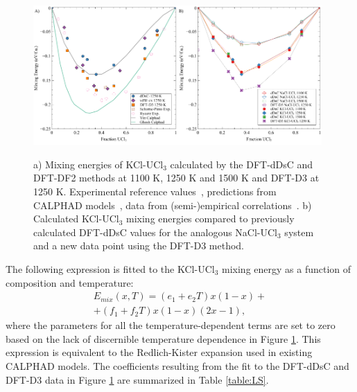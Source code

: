 \documentclass[preprint,3p,10pt,twocolumn,number,sort&compress]{elsarticle}
\begin{document}
\begin{figure}[h!]
\centering
\includegraphics[width=0.49\textwidth]{ben_fig2a.pdf}\includegraphics[width=0.49\textwidth]{ben_fig2b.pdf}
\caption{a) Mixing energies of KCl-UCl$_3$ calculated by the DFT-dDsC and DFT-DF2 methods at 1100 K, 1250 K and 1500 K and DFT-D3 at 1250 K. Experimental reference values~\cite{Rycerz}, predictions from CALPHAD models~\cite{YIN2020,Ghosh}, data from (semi-)empirical correlations~\cite{Pinto}. b) Calculated KCl-UCl$_3$ mixing energies compared to previously calculated DFT-dDsC values for the analogous NaCl-UCl$_3$ system~\cite{Andersson} and a new data point using the DFT-D3 method. }
\label{fig:KCl_UCl3_energy}
\end{figure}



The following expression is fitted to the KCl-UCl$_3$ mixing energy as a function of composition and temperature:
\begin{equation}
\begin{split}
E_{mix}(x,T)=(e_1+e_2T)x(1-x)+\\
+(f_1+f_2T)x(1-x)(2x-1),
\label{eq:LSE}
\end{split}
\end{equation}
where the parameters for all the temperature-dependent terms are set to zero based on the lack of discernible temperature dependence in Figure \ref{fig:KCl_UCl3_energy}. This expression is equivalent to the Redlich-Kister expansion used in existing CALPHAD models. The coefficients resulting from the fit to the DFT-dDsC and DFT-D3 data in Figure \ref{fig:KCl_UCl3_energy} are summarized in Table \ref{table:LS}. 
\end{document}
